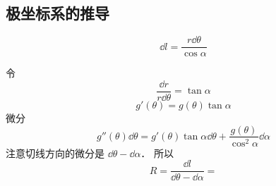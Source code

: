 \subsection{极坐标系的推导}
\begin{equation}
\dd{l} = \frac{r\dd{\theta}}{\cos\alpha}
\end{equation}

令
\begin{equation}
\frac{\dd{r}}{r \dd{\theta}} = \tan\alpha
\end{equation}
\begin{equation}
g'(\theta) = g(\theta)\tan\alpha
\end{equation}
微分
\begin{equation}
g''(\theta)\dd{\theta} = g'(\theta)\tan\alpha\dd{\theta} + \frac{g(\theta)}{\cos^2\alpha}\dd{\alpha}
\end{equation}
注意切线方向的微分是 $\dd{\theta} - \dd{\alpha}$． 所以
\begin{equation}
R = \frac{\dd{l}}{\dd{\theta} - \dd{\alpha}} = 
\end{equation}
